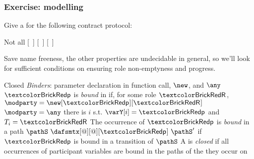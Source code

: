 \begin{frame}
  \frametitle{Exercise: modelling}
  Give a \modelname for the following contract protocol:

\end{frame}

\begin{frame}[t]{Not all \modelnames {}}
  [\ ]
  [\ ]
  [\ ]

  \vpause

  Save name freeness, the other properties are undecidable in general,
  so we'll look for sufficient conditions on \modelnames ensuring role
  non-emptyness and progress.
\end{frame}

\begin{frame}{Closed \modelnames}
  \emph{Binders}: parameter declaration in function call, $\new$, and $\any$
  \vpause
  $\partyP$ is \emph{bound} in \dafsmtx if, for some role $\roleR$,
  $\modparty = \new[\partyP][\roleR]$ \qand[or] $\modparty = \any$
  \qand[or] there is $i$ s.t. $\varY[i] = \partyP$ and $T_i = \roleR$
  \vpause
  The occurrence of $\partyP$ is \emph{bound} in a path
  $\pathS \ \dafsmtx[@][@][\partyP] \ \pathS'$ if $\partyP$ is bound in a
  transition of $\pathS$
  \vpause
  A \modelname is \emph{closed} if all occurrences of participant
  variables are bound in the paths of the \modelname they occur on
\end{frame}

